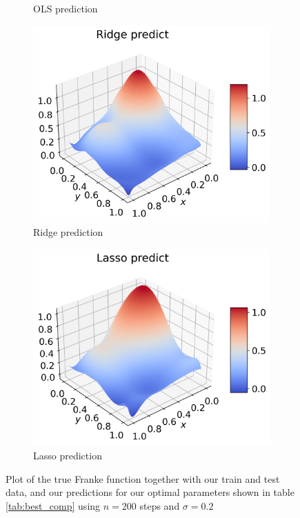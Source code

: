 \documentclass[12pt]{article}
\begin{document}
\begin{figure}[H]
\begin{subfigure}{.5\textwidth}
    \caption{OLS prediction}
    \label{fig:extra_pred_ols}
  \end{subfigure}
  \begin{subfigure}{.5\textwidth}
    \centering
    \includegraphics[width=\textwidth]{../figures/ridge_pred_franke_extra.png}
    \caption{Ridge prediction}
    \label{fig:extra_pred_ridge}
  \end{subfigure}
  \begin{subfigure}{.5\textwidth}
    \centering
    \includegraphics[width=\textwidth]{../figures/lasso_pred_franke_extra.png}
    \caption{Lasso prediction}
    \label{fig:extra_pred_lasso}
  \end{subfigure}
  \caption{Plot of the true Franke function together with our train and test data, and our predictions for our optimal parameters shown in table \ref{tab:best_comp} using $n=200$ steps and $\sigma=0.2$ }
  \label{fig:extra_pred_franke}
\end{figure}
\end{document}
